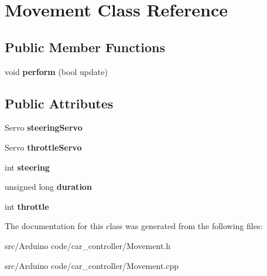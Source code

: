 \hypertarget{class_movement}{}\section{Movement Class Reference}
\label{class_movement}
\subsection*{Public Member Functions}
\begin{DoxyCompactItemize}
\item 
void {\bfseries perform} (bool update)\hypertarget{class_movement_a96a1882630bcb9731b310f4b09953efd}{}\label{class_movement_a96a1882630bcb9731b310f4b09953efd}

\end{DoxyCompactItemize}
\subsection*{Public Attributes}
\begin{DoxyCompactItemize}
\item 
Servo {\bfseries steering\+Servo}\hypertarget{class_movement_ac7a41b832257c21bbb0f8589894e393c}{}\label{class_movement_ac7a41b832257c21bbb0f8589894e393c}

\item 
Servo {\bfseries throttle\+Servo}\hypertarget{class_movement_aafb3fa3ac6ee4a423f4ad215d4bc2d59}{}\label{class_movement_aafb3fa3ac6ee4a423f4ad215d4bc2d59}

\item 
int {\bfseries steering}\hypertarget{class_movement_a98a40efe3f5b192d791aacf07eb293ae}{}\label{class_movement_a98a40efe3f5b192d791aacf07eb293ae}

\item 
unsigned long {\bfseries duration}\hypertarget{class_movement_a99e1efd5b0839b319f84ebd9aa7f5570}{}\label{class_movement_a99e1efd5b0839b319f84ebd9aa7f5570}

\item 
int {\bfseries throttle}\hypertarget{class_movement_a5797d5706a49feff121ca22a4fa6669d}{}\label{class_movement_a5797d5706a49feff121ca22a4fa6669d}

\end{DoxyCompactItemize}


The documentation for this class was generated from the following files\+:\begin{DoxyCompactItemize}
\item 
src/\+Arduino code/car\+\_\+controller/Movement.\+h\item 
src/\+Arduino code/car\+\_\+controller/Movement.\+cpp\end{DoxyCompactItemize}
